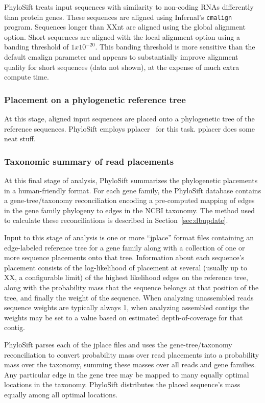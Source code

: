 \documentclass[10pt]{article}
\begin{document}
PhyloSift treats input sequences with similarity to non-coding RNAs differently than protein genes.
These sequences are aligned using Infernal's \texttt{cmalign} program.
Sequences longer than XXnt are aligned using the global alignment option.
Short sequences are aligned with the local alignment option using a banding threshold of $1x10^{-20}$.
This banding threshold is more sensitive than the default cmalign parameter and appears to substantially improve alignment quality for short sequences (data not shown), at the expense of much extra compute time.

\subsubsection*{Placement on a phylogenetic reference tree}

At this stage, aligned input sequences are placed onto a phylogenetic tree of the reference sequences.
PhyloSift employs pplacer~\cite{Matsen2010} for this task.
pplacer does some neat stuff.


\subsubsection*{Taxonomic summary of read placements}
At this final stage of analysis, PhyloSift summarizes the phylogenetic placements in a human-friendly format.
For each gene family, the PhyloSift database contains a gene-tree/taxonomy reconciliation encoding a pre-computed mapping of edges in the gene family phylogeny to edges in the NCBI taxonomy.
The method used to calculate these reconciliations is described in Section~\ref{sec:dbupdate}.

Input to this stage of analysis is one or more ``jplace'' format files containing an edge-labeled reference tree for a gene family along with a collection of one or more sequence placements onto that tree.
Information about each sequence's placement consists of the log-likelihood of placement at several (usually up to XX, a configurable limit) of the highest likelihood edges on the reference tree, along with the probability mass that the sequence belongs at that position of the tree, and finally the weight of the sequence. 
When analyzing unassembled reads sequence weights are typically always 1, when analyzing assembled contigs the weights may be set to a value based on estimated depth-of-coverage for that contig.

PhyloSift parses each of the jplace files and uses the gene-tree/taxonomy reconciliation to convert probability mass over read placements into a probability mass over the taxonomy, summing these masses over all reads and gene families.
Any particular edge in the gene tree may be mapped to many equally optimal locations in the taxonomy.
PhyloSift distributes the placed sequence's mass equally among all optimal locations.
\end{document}
